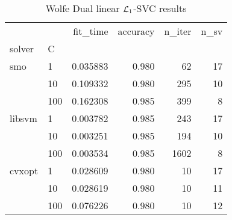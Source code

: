 \begin{table}[H]
\centering
\caption{Wolfe Dual linear $\protect \mathcal{L}_1$-SVC results}
\label{linear_dual_l1_svc_cv_results}
\begin{tabular}{llrrrr}
\toprule
       &     &  fit\_time &  accuracy &  n\_iter &  n\_sv \\
solver & C &           &           &         &       \\
\midrule
smo & 1   &  0.035883 &     0.980 &      62 &    17 \\
       & 10  &  0.109332 &     0.980 &     295 &    10 \\
       & 100 &  0.162308 &     0.985 &     399 &     8 \\
libsvm & 1   &  0.003782 &     0.985 &     243 &    17 \\
       & 10  &  0.003251 &     0.985 &     194 &    10 \\
       & 100 &  0.003534 &     0.985 &    1602 &     8 \\
cvxopt & 1   &  0.028609 &     0.980 &      10 &    17 \\
       & 10  &  0.028619 &     0.980 &      10 &    11 \\
       & 100 &  0.076226 &     0.980 &      10 &    12 \\
\bottomrule
\end{tabular}
\end{table}
